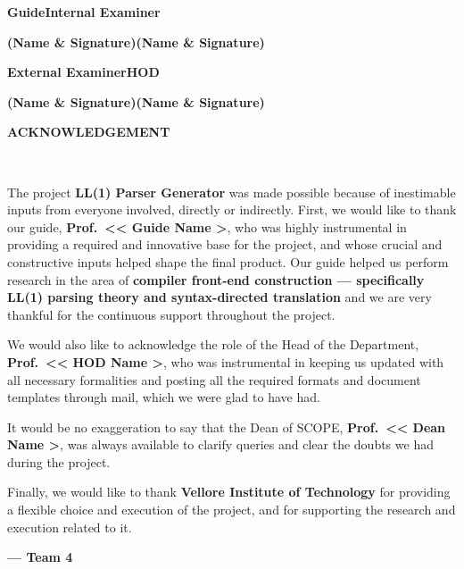 \documentclass[12pt,a4paper,oneside,openany]{report}
\newcommand{\pmpage}[1]{%
  \clearpage\thispagestyle{fancy}%
  \begin{center}\bfseries\fontsize{14}{18}\selectfont #1\end{center}%
  \vspace{0.6em}}
\begin{document}
\vspace{2.6em}\noindent
\textbf{Guide}\hfill\textbf{Internal Examiner}\par
\vspace{0.6em}\noindent
\textbf{(Name \& Signature)}\hfill\textbf{(Name \& Signature)}\par
\vspace{2.6em}\noindent
\textbf{External Examiner}\hfill\textbf{HOD}\par
\vspace{0.6em}\noindent
\textbf{(Name \& Signature)}\hfill\textbf{(Name \& Signature)}\par

\pmpage{ACKNOWLEDGEMENT}
~\vspace{0.5em}

The project \textbf{LL(1) Parser Generator} was made possible because of
inestimable inputs from everyone involved, directly or indirectly. First, we
would like to thank our guide, \textbf{Prof.\ << Guide Name \>>}, who was
highly instrumental in providing a required and innovative base for the
project, and whose crucial and constructive inputs helped shape the final
product. Our guide helped us perform research in the area of \textbf{compiler
front-end construction --- specifically LL(1) parsing theory and
syntax-directed translation} and we are very thankful for the continuous
support throughout the project.

We would also like to acknowledge the role of the Head of the Department,
\textbf{Prof.\ << HOD Name \>>}, who was instrumental in keeping us updated
with all necessary formalities and posting all the required formats and
document templates through mail, which we were glad to have had.

It would be no exaggeration to say that the Dean of SCOPE, \textbf{Prof.\ <<
Dean Name \>>}, was always available to clarify queries and clear the doubts
we had during the project.

Finally, we would like to thank \textbf{Vellore Institute of Technology} for
providing a flexible choice and execution of the project, and for supporting
the research and execution related to it.

\textbf{--- Team 4}
\end{document}
